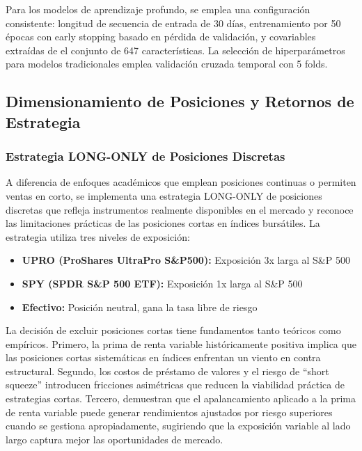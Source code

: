 \documentclass[11pt,a4paper]{article}
\begin{document}
Para los modelos de aprendizaje profundo, se emplea una configuración consistente: longitud de secuencia de entrada de 30 días, entrenamiento por 50 épocas con early stopping basado en pérdida de validación, y covariables extraídas de el conjunto de 647 características. La selección de hiperparámetros para modelos tradicionales emplea validación cruzada temporal con 5 folds.

\subsection{Dimensionamiento de Posiciones y Retornos de Estrategia}

\subsubsection{Estrategia LONG-ONLY de Posiciones Discretas}

A diferencia de enfoques académicos que emplean posiciones continuas o permiten ventas en corto, se implementa una estrategia LONG-ONLY de posiciones discretas que refleja instrumentos realmente disponibles en el mercado y reconoce las limitaciones prácticas de las posiciones cortas en índices bursátiles. La estrategia utiliza tres niveles de exposición:

\begin{itemize}[noitemsep]
    \item \textbf{UPRO (ProShares UltraPro S\&P500):} Exposición 3x larga al S\&P 500
    \item \textbf{SPY (SPDR S\&P 500 ETF):} Exposición 1x larga al S\&P 500
    \item \textbf{Efectivo:} Posición neutral, gana la tasa libre de riesgo
\end{itemize}

La decisión de excluir posiciones cortas tiene fundamentos tanto teóricos como empíricos. Primero, la prima de renta variable históricamente positiva implica que las posiciones cortas sistemáticas en índices enfrentan un viento en contra estructural. Segundo, los costos de préstamo de valores y el riesgo de ``short squeeze'' introducen fricciones asimétricas que reducen la viabilidad práctica de estrategias cortas. Tercero, \citet{frazzini2012} demuestran que el apalancamiento aplicado a la prima de renta variable puede generar rendimientos ajustados por riesgo superiores cuando se gestiona apropiadamente, sugiriendo que la exposición variable al lado largo captura mejor las oportunidades de mercado.
\end{document}

